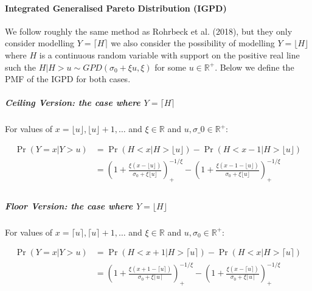 \documentclass[
]{article}
\let\oldparagraph\paragraph
\renewcommand{\paragraph}[1]{\oldparagraph{#1}\mbox{}}
\let\oldsubparagraph\subparagraph
\renewcommand{\subparagraph}[1]{\oldsubparagraph{#1}\mbox{}}
\begin{document}
\hypertarget{integrated-generalised-pareto-distribution-igpd}{%
\paragraph{Integrated Generalised Pareto Distribution
(IGPD)}\label{integrated-generalised-pareto-distribution-igpd}}

We follow roughly the same method as Rohrbeck et al. (2018), but they
only consider modelling \(Y=\lceil H\rceil\) we also consider the
possibility of modelling \(Y=\lfloor H\rfloor\) where \(H\) is a
continuous random variable with support on the positive real line such
the \(H|H>u \sim GPD(\sigma_0 + \xi u, \xi)\) for some
\(u\in \mathbb{R}^+\). Below we define the PMF of the IGPD for both
cases.

\hypertarget{ceiling-version-the-case-where-ylceil-h-rceil}{%
\subparagraph{\texorpdfstring{Ceiling Version: the case where
\(Y=\lceil H \rceil\)}{Ceiling Version: the case where Y=\textbackslash lceil H \textbackslash rceil}}\label{ceiling-version-the-case-where-ylceil-h-rceil}}

For values of \(x = \lfloor u \rfloor , \lfloor u \rfloor +1, \ldots\)
and \(\xi\in\mathbb{R}\) and \(u,\sigma\_0 \in \mathbb{R}^+\):

\begin{align*}
\Pr(Y=x|Y>u) &= \Pr(H<x|H>\lfloor u \rfloor) - \Pr(H<x-1|H>\lfloor u \rfloor)\\ 
             &= \left(1+\frac{\xi(x-\lfloor u \rfloor)}{\sigma_0 + \xi \lfloor u \rfloor}\right)_+^{-1/\xi} - \left(1+\frac{\xi(x-1-\lfloor u \rfloor)}{\sigma_0 + \xi \lfloor u \rfloor}\right)_+^{-1/\xi}\\
%
\end{align*}

\hypertarget{floor-version-the-case-where-ylfloor-h-rfloor}{%
\subparagraph{\texorpdfstring{Floor Version: the case where
\(Y=\lfloor H \rfloor\)}{Floor Version: the case where Y=\textbackslash lfloor H \textbackslash rfloor}}\label{floor-version-the-case-where-ylfloor-h-rfloor}}

For values of \(x = \lceil u \rceil , \lceil u \rceil +1, \ldots\) and
\(\xi\in\mathbb{R}\) and \(u,\sigma_0 \in \mathbb{R}^+\):

\begin{align*}
\Pr(Y=x|Y>u) &= \Pr(H<x+1|H>\lceil u \rceil) - \Pr(H<x|H>\lceil u \rceil)\\ 
             &= \left(1+\frac{\xi(x+1-\lceil u \rceil)}{\sigma_0 + \xi \lceil u \rceil}\right)_+^{-1/\xi} - \left(1+\frac{\xi(x-\lceil u \rceil)}{\sigma_0 + \xi \lceil u \rceil}\right)_+^{-1/\xi}\\
%
\end{align*}
\end{document}
